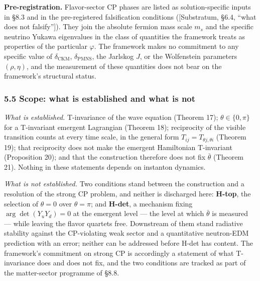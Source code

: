 \documentclass[
]{article}
\begin{document}
\textbf{Pre-registration.} Flavor-sector CP phases are listed as
solution-specific inputs in §8.3 and in the pre-registered falsification
conditions ({[}Substratum, §6.4, ``what does not falsify''{]}). They
join the absolute fermion mass scale \(m_s\) and the specific neutrino
Yukawa eigenvalues in the class of quantities the framework treats as
properties of the particular \(\varphi\). The framework makes no
commitment to any specific value of \(\delta_{\text{CKM}}\),
\(\delta_{\text{PMNS}}\), the Jarlskog \(J\), or the Wolfenstein
parameters \((\rho, \eta)\), and the measurement of these quantities
does not bear on the framework's structural status.

\hypertarget{scope-what-is-established-and-what-is-not}{%
\subsubsection{5.5 Scope: what is established and what is
not}\label{scope-what-is-established-and-what-is-not}}

\emph{What is established.} T-invariance of the wave equation (Theorem
17); \(\theta\in\{0,\pi\}\) for a T-invariant emergent Lagrangian
(Theorem 18); reciprocity of the visible transition counts at every time
scale, in the general form \(T_{ij}=T_{\theta j,\theta i}\) (Theorem
19); that reciprocity does not make the emergent Hamiltonian T-invariant
(Proposition 20); and that the construction therefore does not fix
\(\bar\theta\) (Theorem 21). Nothing in these statements depends on
instanton dynamics.

\emph{What is not established.} Two conditions stand between the
construction and a resolution of the strong CP problem, and neither is
discharged here: \textbf{H-top}, the selection of \(\theta=0\) over
\(\theta=\pi\); and \textbf{H-det}, a mechanism fixing
\(\arg\det(Y_uY_d)=0\) at the emergent level --- the level at which
\(\bar\theta\) is measured --- while leaving the flavor quartets free.
Downstream of them stand radiative stability against the CP-violating
weak sector and a quantitative neutron-EDM prediction with an error;
neither can be addressed before H-det has content. The framework's
commitment on strong CP is accordingly a statement of what T-invariance
does and does not fix, and the two conditions are tracked as part of the
matter-sector programme of §8.8.
\end{document}
